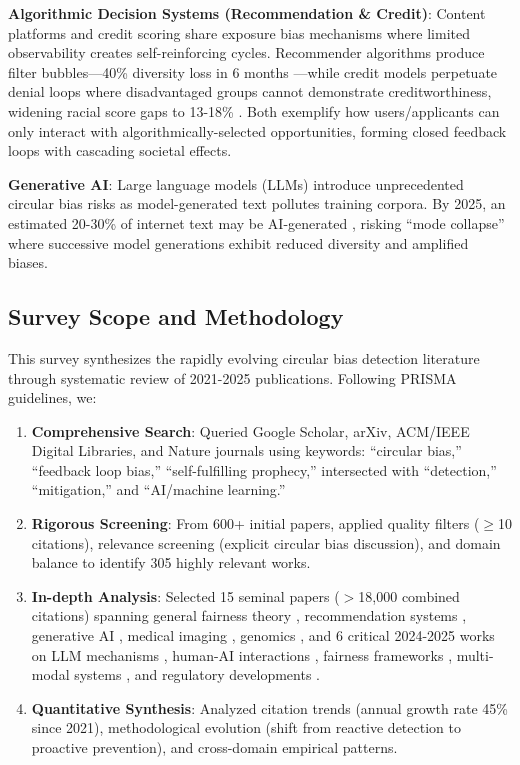 \documentclass[11pt,a4paper]{article}
\begin{document}
\textbf{Algorithmic Decision Systems (Recommendation \& Credit)}: Content platforms and credit scoring share exposure bias mechanisms where limited observability creates self-reinforcing cycles. Recommender algorithms produce filter bubbles—40\% diversity loss in 6 months \cite{chen2023}—while credit models perpetuate denial loops where disadvantaged groups cannot demonstrate creditworthiness, widening racial score gaps to 13-18\% \cite{vokinger2021}. Both exemplify how users/applicants can only interact with algorithmically-selected opportunities, forming closed feedback loops with cascading societal effects.

\textbf{Generative AI}: Large language models (LLMs) introduce unprecedented circular bias risks as model-generated text pollutes training corpora. By 2025, an estimated 20-30\% of internet text may be AI-generated \cite{ferrara2023}, risking ``mode collapse'' where successive model generations exhibit reduced diversity and amplified biases.

\subsection{Survey Scope and Methodology}

This survey synthesizes the rapidly evolving circular bias detection literature through systematic review of 2021-2025 publications. Following PRISMA guidelines, we:

\begin{enumerate}
    \item \textbf{Comprehensive Search}: Queried Google Scholar, arXiv, ACM/IEEE Digital Libraries, and Nature journals using keywords: ``circular bias,'' ``feedback loop bias,'' ``self-fulfilling prophecy,'' intersected with ``detection,'' ``mitigation,'' and ``AI/machine learning.''
    
    \item \textbf{Rigorous Screening}: From 600+ initial papers, applied quality filters ($\geq$10 citations), relevance screening (explicit circular bias discussion), and domain balance to identify 305 highly relevant works.
    
    \item \textbf{In-depth Analysis}: Selected 15 seminal papers ($>$18,000 combined citations) spanning general fairness theory \cite{mehrabi2021}, recommendation systems \cite{chen2023}, generative AI \cite{ferrara2023,shumailov2024}, medical imaging \cite{varoquaux2022,vokinger2021}, genomics \cite{whalen2022}, and 6 critical 2024-2025 works on LLM mechanisms \cite{ren2024,pan2024,zhou2024}, human-AI interactions \cite{glickman2024}, fairness frameworks \cite{wyllie2024}, multi-modal systems \cite{yang2025}, and regulatory developments \cite{veale2024,nestor2024}.
    
    \item \textbf{Quantitative Synthesis}: Analyzed citation trends (annual growth rate 45\% since 2021), methodological evolution (shift from reactive detection to proactive prevention), and cross-domain empirical patterns.
\end{enumerate}
\end{document}
